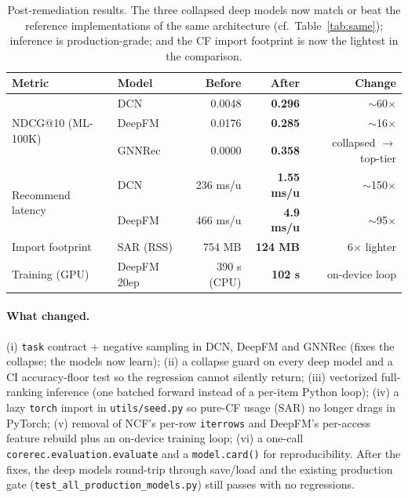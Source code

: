 \documentclass[10pt]{article}
\begin{document}
\begin{table}[h]\centering\small
\begin{tabular}{llrrr}
\toprule
Metric & Model & Before & After & Change \\
\midrule
\multirow{3}{*}{NDCG@10 (ML-100K)}
 & DCN     & 0.0048 & \textbf{0.296} & $\sim$60$\times$ \\
 & DeepFM  & 0.0176 & \textbf{0.285} & $\sim$16$\times$ \\
 & GNNRec  & 0.0000 & \textbf{0.358} & collapsed $\rightarrow$ top-tier \\
\midrule
\multirow{2}{*}{Recommend latency}
 & DCN     & 236 ms/u & \textbf{1.55 ms/u} & $\sim$150$\times$ \\
 & DeepFM  & 466 ms/u & \textbf{4.9 ms/u}  & $\sim$95$\times$ \\
\midrule
Import footprint & SAR (RSS) & 754 MB & \textbf{124 MB} & 6$\times$ lighter \\
Training (GPU)   & DeepFM 20ep & 390 s (CPU) & \textbf{102 s} & on-device loop \\
\bottomrule
\end{tabular}
\caption{Post-remediation results. The three collapsed deep models now match or
beat the reference implementations of the same architecture (cf.\
Table~\ref{tab:same}); inference is production-grade; and the CF import footprint
is now the lightest in the comparison.}
\label{tab:remediation}
\end{table}

\paragraph{What changed.} (i) \texttt{task} contract + negative sampling in DCN,
DeepFM and GNNRec (fixes the collapse; the models now learn); (ii) a collapse
guard on every deep model and a CI accuracy-floor test so the regression cannot
silently return; (iii) vectorized full-ranking inference (one batched forward
instead of a per-item Python loop); (iv) a lazy \texttt{torch} import in
\texttt{utils/seed.py} so pure-CF usage (SAR) no longer drags in PyTorch; (v)
removal of NCF's per-row \texttt{iterrows} and DeepFM's per-access feature rebuild
plus an on-device training loop; (vi) a one-call \texttt{corerec.evaluation.evaluate}
and a \texttt{model.card()} for reproducibility. After the fixes, the deep models
round-trip through save/load and the existing production gate
(\texttt{test\_all\_production\_models.py}) still passes with no regressions.
\end{document}
